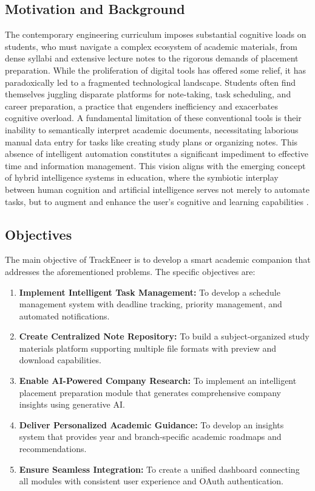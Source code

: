 \documentclass[12pt]{article}
\begin{document}
\subsection{Motivation and Background}
The contemporary engineering curriculum imposes substantial cognitive loads on students, who must navigate a complex ecosystem of academic materials, from dense syllabi and extensive lecture notes to the rigorous demands of placement preparation. While the proliferation of digital tools has offered some relief, it has paradoxically led to a fragmented technological landscape. Students often find themselves juggling disparate platforms for note-taking, task scheduling, and career preparation, a practice that engenders inefficiency and exacerbates cognitive overload. A fundamental limitation of these conventional tools is their inability to semantically interpret academic documents, necessitating laborious manual data entry for tasks like creating study plans or organizing notes. This absence of intelligent automation constitutes a significant impediment to effective time and information management. This vision aligns with the emerging concept of hybrid intelligence systems in education, where the symbiotic interplay between human cognition and artificial intelligence serves not merely to automate tasks, but to augment and enhance the user's cognitive and learning capabilities \cite{b10}.

\subsection{Objectives}
The main objective of TrackEneer is to develop a smart academic companion that addresses the aforementioned problems. The specific objectives are:
\begin{enumerate}
    \item \textbf{Implement Intelligent Task Management:} To develop a schedule management system with deadline tracking, priority management, and automated notifications.
    \item \textbf{Create Centralized Note Repository:} To build a subject-organized study materials platform supporting multiple file formats with preview and download capabilities.
    \item \textbf{Enable AI-Powered Company Research:} To implement an intelligent placement preparation module that generates comprehensive company insights using generative AI.
    \item \textbf{Deliver Personalized Academic Guidance:} To develop an insights system that provides year and branch-specific academic roadmaps and recommendations.
    \item \textbf{Ensure Seamless Integration:} To create a unified dashboard connecting all modules with consistent user experience and OAuth authentication.
\end{enumerate}
\end{document}
